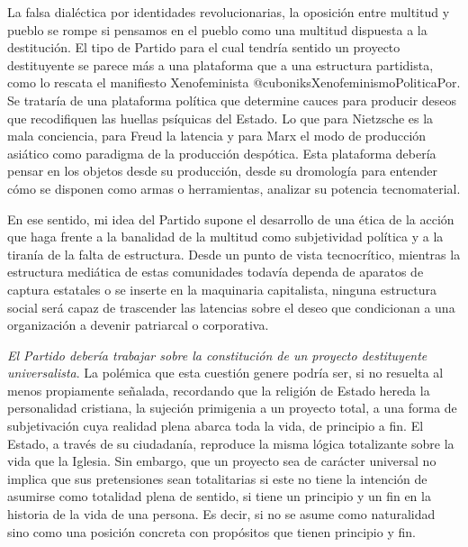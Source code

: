 La falsa dialéctica por identidades revolucionarias, la oposición entre multitud y pueblo se rompe si pensamos en el pueblo como una multitud dispuesta a la destitución. El tipo de Partido para el cual tendría sentido un proyecto destituyente se parece más a una plataforma que a una estructura partidista, como lo rescata el manifiesto Xenofeminista @cuboniksXenofeminismoPoliticaPor. Se trataría de una plataforma política que determine cauces para producir deseos que recodifiquen las huellas psíquicas del Estado. Lo que para Nietzsche es la mala conciencia, para Freud la latencia y para Marx el modo de producción asiático como paradigma de la producción despótica. Esta plataforma debería pensar en los objetos desde su producción, desde su dromología para entender cómo se disponen como armas o herramientas, analizar su potencia tecnomaterial.

En ese sentido, mi idea del Partido supone el desarrollo de una ética de la acción que haga frente a la banalidad de la multitud como subjetividad política y a la tiranía de la falta de estructura. Desde un punto de vista tecnocrítico, mientras la estructura mediática de estas comunidades todavía dependa de aparatos de captura estatales o se inserte en la maquinaria capitalista, ninguna estructura social será capaz de trascender las latencias sobre el deseo que condicionan a una organización a devenir patriarcal o corporativa.

\emph{El Partido debería trabajar sobre la constitución de un proyecto destituyente universalista}. La polémica que esta cuestión genere podría ser, si no resuelta al menos propiamente señalada, recordando que la religión de Estado hereda la personalidad cristiana, la sujeción primigenia a un proyecto total, a una forma de subjetivación cuya realidad plena abarca toda la vida, de principio a fin. El Estado, a través de su ciudadanía, reproduce la misma lógica totalizante sobre la vida que la Iglesia. Sin embargo, que un proyecto sea de carácter universal no implica que sus pretensiones sean totalitarias si este no tiene la intención de asumirse como totalidad plena de sentido, si tiene un principio y un fin en la historia de la vida de una persona. Es decir, si no se asume como naturalidad sino como una posición concreta con propósitos que tienen principio y fin.

